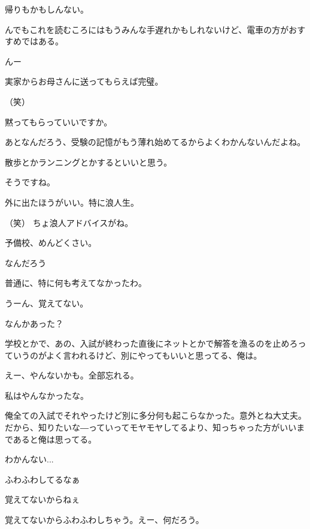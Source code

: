 \begin{multicols}{3}
{        帰りもかもしんない。

        んでもこれを読むころにはもうみんな手遅れかもしれないけど、電車の方がおすすめではある。

        んー

        実家からお母さんに送ってもらえば完璧。

        （笑）

        黙ってもらっていいですか。

        あとなんだろう、受験の記憶がもう薄れ始めてるからよくわかんないんだよね。

        散歩とかランニングとかするといいと思う。

        そうですね。

        外に出たほうがいい。特に浪人生。

        （笑） ちょ浪人アドバイスがね。

        予備校、めんどくさい。

        なんだろう

        普通に、特に何も考えてなかったわ。

        うーん、覚えてない。

        なんかあった？

        学校とかで、あの、入試が終わった直後にネットとかで解答を漁るのを止めろっていうのがよく言われるけど、別にやってもいいと思ってる、俺は。

        えー、やんないかも。全部忘れる。

        私はやんなかったな。

        俺全ての入試でそれやったけど別に多分何も起こらなかった。意外とね大丈夫。だから、知りたいな―っていってモヤモヤしてるより、知っちゃった方がいいまであると俺は思ってる。

    


    

        わかんない...

        ふわふわしてるなぁ

        覚えてないからねぇ

        覚えてないからふわふわしちゃう。えー、何だろう。

}
\end{multicols}
